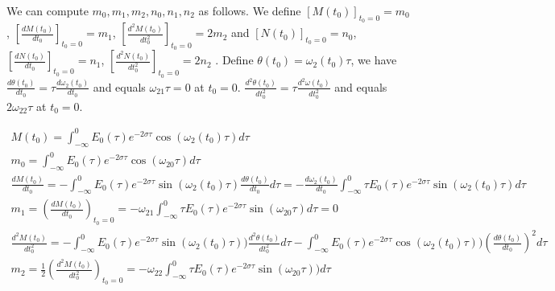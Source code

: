 \documentclass[11pt]{elsarticle}
\begin{document}



We can compute $m_0, m_1, m_2, n_0, n_1, n_2$ as follows. We define $[M(t_0)]_{t_0=0}=m_{0}$, $[\frac{dM(t_0)}{dt_0}]_{t_0=0}=m_{1}$, $[\frac{d^{2}M(t_0)}{dt_{0}^{2}}]_{t_0=0} = 2 m_{2} $ and $[N(t_0)]_{t_0=0}=n_{0}$, $[\frac{dN(t_0)}{dt_0}]_{t_0=0}=n_{1}$, $[\frac{d^{2}N(t_0)}{dt_{0}^{2}}]_{t_0=0} = 2 n_{2} $ . Define $\theta(t_0) = \omega_2(t_0) \tau$, we have $\frac{d\theta(t_0)}{dt_0} = \tau \frac{d\omega_2(t_0)}{dt_0}$ and equals $\omega_{21} \tau = 0$ at $t_0=0$.  $\frac{d^{2}\theta(t_0)}{dt_0^{2}} =  \tau \frac{d^{2}\omega(t_0)}{dt_0^{2}}$ and equals $2 \omega_{22} \tau$ at $t_0=0$.


\begin{eqnarray*}\label{app_F_4_eq_1}   
M(t_0) =  \int_{-\infty}^{0}    E_0(\tau)e^{-2 \sigma \tau}  \cos{ (\omega_2(t_0) \tau)} d\tau \\
m_0 =  \int_{-\infty}^{0}    E_0(\tau)e^{-2 \sigma \tau}  \cos{ (\omega_{20} \tau)} d\tau \\
\frac{dM(t_0)}{dt_0} = - \int_{-\infty}^{0}    E_0(\tau)e^{-2 \sigma \tau}  \sin{ (\omega_2(t_0) \tau)} \frac{d\theta(t_0)}{dt_0}  d\tau = - \frac{d\omega_2(t_0)}{dt_0}  \int_{-\infty}^{0}  \tau  E_0(\tau)e^{-2 \sigma \tau}  \sin{ (\omega_2(t_0) \tau)} d\tau  \\
m_1 = (\frac{dM(t_0)}{dt_0})_{t_0=0} = - \omega_{21} \int_{-\infty}^{0}  \tau  E_0(\tau)e^{-2 \sigma \tau}  \sin{ (\omega_{20} \tau)}   d\tau = 0 \\
\frac{d^{2}M(t_0)}{dt_0^{2}} = - \int_{-\infty}^{0}    E_0(\tau)e^{-2 \sigma \tau}  \sin{ (\omega_2(t_0) \tau)}) \frac{d^{2}\theta(t_0)}{dt_0^{2}}  d\tau - \int_{-\infty}^{0}    E_0(\tau)e^{-2 \sigma \tau}  \cos{ (\omega_2(t_0) \tau)}) (\frac{d\theta(t_0)}{dt_0})^{2}  d\tau  \\
m_2 = \frac{1}{2} (\frac{d^{2}M(t_0)}{dt_0^{2}})_{t_0=0} = - \omega_{22} \int_{-\infty}^{0}  \tau  E_0(\tau)e^{-2 \sigma \tau}  \sin{ (\omega_{20} \tau)}) d\tau  
\end{eqnarray*}
\begin{equation} \end{equation}
\end{document}
